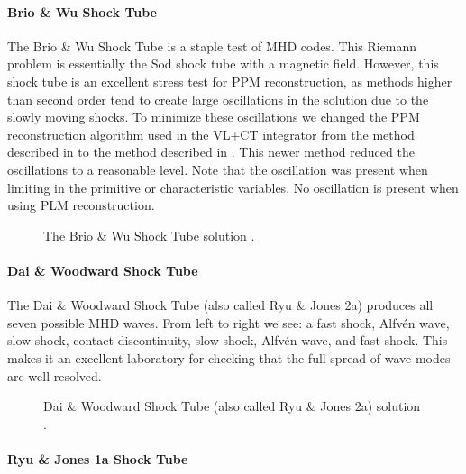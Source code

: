 \paragraph{Brio \& Wu Shock Tube}

The Brio \& Wu Shock Tube \citep{brio_wu_1988} is a staple test of MHD codes. This Riemann problem is essentially the Sod shock tube \cite{sod_1978} with a magnetic field. However, this shock tube is an excellent stress test for PPM reconstruction, as methods higher than second order tend to create large oscillations in the solution due to the slowly moving shocks. To minimize these oscillations we changed the PPM reconstruction algorithm used in the VL+CT integrator from the method described in \cite{stone_athena_2008} to the method described in \cite{felker_2018}. This newer method reduced the oscillations to a reasonable level. Note that the oscillation was present when limiting in the primitive or characteristic variables. No oscillation is present when using PLM reconstruction.

\begin{figure}[ht!]
    \caption{The Brio \& Wu Shock Tube solution \citep{brio_wu_1988}.
    }
    \label{fig:brio-and-wu}
\end{figure}

\paragraph{Dai \& Woodward Shock Tube}

The Dai \& Woodward Shock Tube (also called Ryu \& Jones 2a) \citep{dai_woodward_1998, ryu_jones_1995} produces all seven possible MHD waves. From left to right we see: a fast shock, Alfvén wave, slow shock, contact discontinuity, slow shock, Alfvén wave, and fast shock. This makes it an excellent laboratory for checking that the full spread of wave modes are well resolved.

\begin{figure}[ht!]
    \caption{Dai \& Woodward Shock Tube (also called Ryu \& Jones 2a) solution \citep{dai_woodward_1998, ryu_jones_1995}.
    }
    \label{fig:dai-and-woodward}
\end{figure}

\paragraph{Ryu \& Jones 1a Shock Tube}

